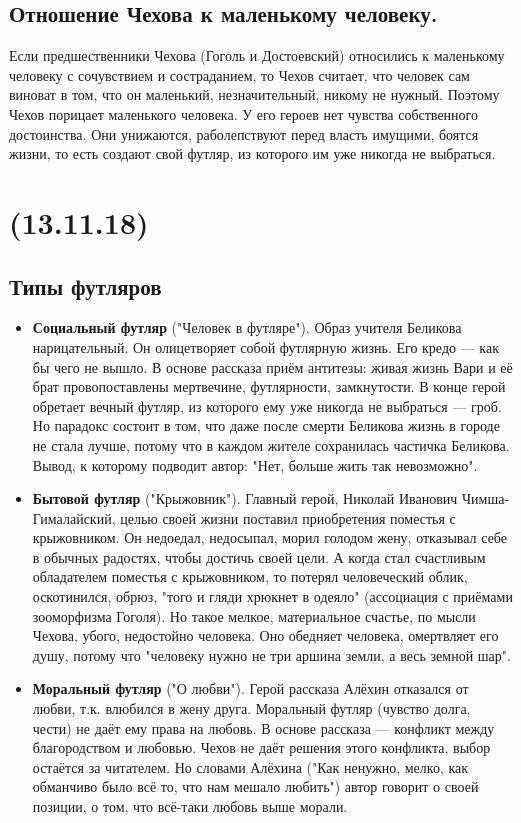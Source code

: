 \documentclass{article}
\begin{document}
\subsection{Отношение Чехова к маленькому человеку.}
Если предшественники Чехова (Гоголь и Достоевский) относились к маленькому человеку с сочувствием и состраданием, то
Чехов считает, что человек сам виноват в том, что он маленький, незначительный, никому не нужный. Поэтому Чехов
порицает маленького человека. У его героев нет чувства собственного достоинства. Они унижаются, раболепствуют перед
власть имущими, боятся жизни, то есть создают свой футляр, из которого им уже никогда не выбраться.

\newpage
\noindent\makebox[\linewidth]{\rule{\paperwidth}{0.4pt}}
\section{(13.11.18)}
\noindent\makebox[\linewidth]{\rule{\paperwidth}{0.4pt}}

\subsection{Типы футляров}

\begin{itemize}
\item
  \textbf{Социальный футляр} ("Человек в футляре").
  Образ учителя Беликова нарицательный. Он олицетворяет собой футлярную жизнь.
  Его кредо --- как бы чего не вышло. В основе рассказа приём антитезы: живая жизнь Вари и её брат провопоставлены
  мертвечине, футлярности, замкнутости. В конце герой обретает вечный футляр, из которого ему уже никогда не выбраться
  --- гроб. Но парадокс состоит в том, что даже после смерти Беликова жизнь в городе не стала лучше, потому что в
  каждом жителе сохранилась частичка Беликова. Вывод, к которому подводит автор: "Нет, больше жить так невозможно".
\item
  \textbf{Бытовой футляр} ("Крыжовник").
  Главный герой, Николай Иванович Чимша-Гималайский, целью своей жизни поставил
  приобретения поместья с крыжовником. Он недоедал, недосыпал, морил голодом жену, отказывал себе в обычных радостях,
  чтобы достичь своей цели. А когда стал счастливым обладателем поместья с крыжовником, то потерял человеческий облик,
  оскотинился, обрюз, "того и гляди хрюкнет в одеяло" (ассоциация с приёмами зооморфизма Гоголя). Но такое мелкое,
  материальное счастье, по мысли Чехова, убого, недостойно человека. Оно обедняет человека, омертвляет его душу, потому
  что "человеку нужно не три аршина земли, а весь земной шар".
\item
  \textbf{Моральный футляр} ("О любви").
  Герой рассказа Алёхин отказался от любви, т.к. влюбился в жену друга. Моральный футляр
  (чувство долга, чести) не даёт ему права на любовь. В основе рассказа --- конфликт между благородством и любовью.
  Чехов не даёт решения этого конфликта, выбор остаётся за читателем. Но словами Алёхина ("Как ненужно, мелко, как
  обманчиво было всё то, что нам мешало любить") автор говорит о своей позиции, о том, что всё-таки любовь выше морали.
\end{itemize}
\end{document}
